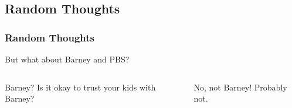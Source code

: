 





\subsection{Random Thoughts}
\begin{frame}
  \frametitle{Random Thoughts}
  But what about Barney and PBS?

  \begin{columns}[t]
    
    \begin{block}{Barney?}
      Is it okay to trust your kids with Barney?
    \end{block}
    \pause
  
    \begin{block}{No, not Barney!}
      Probably not.
    \end{block}

  \end{columns}


\end{frame}

